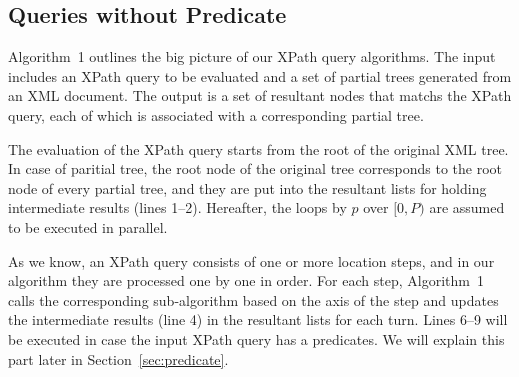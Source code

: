\subsection{Queries without Predicate}

Algorithm~1 outlines the big picture of our XPath query algorithms. The input
includes an XPath query to be evaluated and a set of partial trees generated
from an XML document. The output is a set of resultant nodes that matchs the
XPath query, each of which is associated with a corresponding partial tree.

The evaluation of the XPath query starts from the root of the original XML tree.
In case of paritial tree, the root node of the original tree corresponds to the
root node of every partial tree, and they are put into the resultant lists for
holding intermediate results (lines 1--2). Hereafter, the loops by $p$ over $[0,
P)$ are assumed to be executed in parallel.

As we know, an XPath query consists of one or more location steps, and in our
algorithm they are processed one by one in order. For each step, Algorithm~1
calls the corresponding sub-algorithm based on the axis of the step and updates
the intermediate results (line 4) in the resultant lists for each turn. Lines
6--9 will be executed in case the input XPath query has a predicates. We will
explain this part later in Section~\ref{sec:predicate}.


